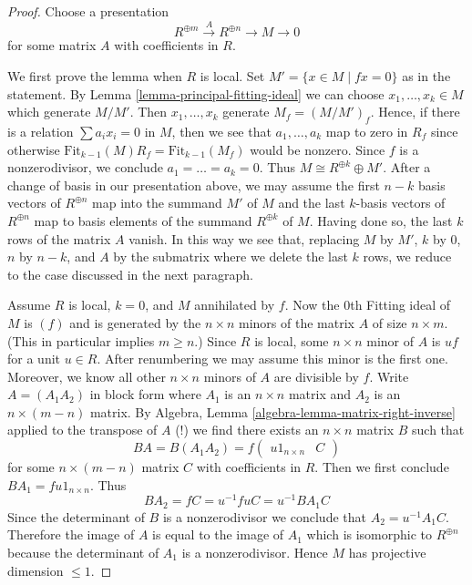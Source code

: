 \begin{proof}
Choose a presentation
$$
R^{\oplus m} \xrightarrow{A} R^{\oplus n} \to M \to 0
$$
for some matrix $A$ with coefficients in $R$.

\medskip\noindent
We first prove the lemma when $R$ is local.
Set $M' = \{x \in M \mid fx = 0\}$ as in the statement. By
Lemma \ref{lemma-principal-fitting-ideal} we can choose
$x_1, \ldots, x_k \in M$ which generate $M/M'$. Then
$x_1, \ldots, x_k$ generate $M_f = (M/M')_f$. Hence,
if there is a relation $\sum a_ix_i = 0$ in $M$,
then we see that $a_1, \ldots, a_k$ map to zero in $R_f$
since otherwise $\text{Fit}_{k - 1}(M) R_f = \text{Fit}_{k - 1}(M_f)$
would be nonzero.
Since $f$ is a nonzerodivisor, we conclude $a_1 = \ldots = a_k = 0$.
Thus $M \cong R^{\oplus k} \oplus M'$. After a change of basis
in our presentation above, we may assume the first $n - k$
basis vectors of $R^{\oplus n}$ map into the summand $M'$ of $M$
and the last $k$-basis vectors of $R^{\oplus n}$ map to
basis elements of the summand $R^{\oplus k}$ of $M$.
Having done so, the last $k$ rows of the matrix $A$ vanish.
In this way we see that, replacing $M$ by $M'$, $k$ by $0$,
$n$ by $n - k$, and $A$ by the submatrix where we
delete the last $k$ rows, we reduce to the case discussed
in the next paragraph.

\medskip\noindent
Assume $R$ is local, $k = 0$, and $M$ annihilated by $f$.
Now the $0$th Fitting ideal of $M$ is $(f)$ and is generated by the
$n \times n$ minors of the matrix $A$ of size $n \times m$.
(This in particular implies $m \geq n$.)
Since $R$ is local, some $n \times n$ minor of $A$ is $uf$
for a unit $u \in R$.
After renumbering we may assume this minor is the first one.
Moreover, we know all other $n \times n$ minors of $A$ are
divisible by $f$. Write $A = (A_1 A_2)$ in block form where
$A_1$ is an $n \times n$ matrix and $A_2$ is an
$n \times (m - n)$ matrix. By
Algebra, Lemma \ref{algebra-lemma-matrix-right-inverse}
applied to the transpose of $A$ (!) we find there exists an
$n \times n$ matrix $B$ such that
$$
BA = B(A_1 A_2) = f
\left(
\begin{matrix}
u 1_{n \times n} & C
\end{matrix}
\right)
$$
for some $n \times (m - n)$ matrix $C$ with coefficients in $R$.
Then we first conclude $BA_1 = fu 1_{n \times n}$.
Thus
$$
BA_2 = fC = u^{-1}fuC = u^{-1}BA_1C
$$
Since the determinant of $B$ is a nonzerodivisor we conclude
that $A_2 = u^{-1}A_1C$. Therefore the image of $A$ is equal
to the image of $A_1$ which is isomorphic to $R^{\oplus n}$
because the determinant of $A_1$ is a nonzerodivisor.
Hence $M$ has projective dimension $\leq 1$.


\end{proof}
